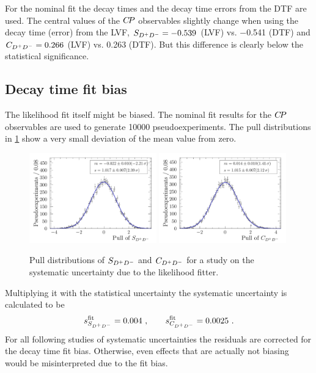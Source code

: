 For the nominal fit the decay times and the decay time errors from the DTF are
used. The central values of the ${C\!P}$ observables slightly change when using
the decay time (error) from the LVF, $S_{{{D}^+}{{D}^-}} = \num{-0.539}$ (LVF) vs.
\num{-0.541} (DTF) and $C_{{{D}^+}{{D}^-}} = \num{0.266}$ (LVF) vs. \num{0.263} (DTF). But
this difference is clearly below the statistical significance.

\FloatBarrier

\subsection{Decay time fit bias}
\label{sec:b02dd:systematics:fitbias}

The likelihood fit itself might be biased. The nominal fit results for the
${C\!P}$ observables are used to generate \num{10000} pseudoexperiments. The pull
distributions in \cref{fig:b02dd:systematics:fitbias:pulls} show a very small
deviation of the mean value from zero.
%
\begin{figure}[htb]
\includegraphics[width=0.49\textwidth]{07-B02DD/tikz/pdf/parSigTimeSin2b_pull_fitbias.pdf}
\includegraphics[width=0.49\textwidth]{07-B02DD/tikz/pdf/parSigTimeC_pull_fitbias.pdf}
\caption{Pull distributions of $S_{{{D}^+}{{D}^-}}$ and $C_{{{D}^+}{{D}^-}}$ for a study on the systematic
uncertainty due to the likelihood fitter.}
\label{fig:b02dd:systematics:fitbias:pulls}
\end{figure}
%
Multiplying it with the statistical uncertainty the systematic uncertainty is
calculated to be
\begin{align}
s_{S_{{{D}^+}{{D}^-}}}^{\textrm{fit}} = \num{0.004}\ , \qquad s_{C_{{{D}^+}{{D}^-}}}^{\textrm{fit}} = \num{0.0025}\ .
\end{align}
For all following studies of systematic uncertainties the residuals are
corrected for the decay time fit bias. Otherwise, even effects that are
actually not biasing would be misinterpreted due to the fit bias.

